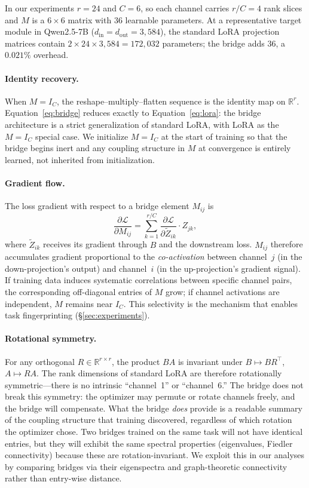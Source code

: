 In our experiments $r = 24$ and $C = 6$, so each channel carries
$r/C = 4$ rank slices and $M$ is a $6 \times 6$ matrix with 36
learnable parameters.
At a representative target module in Qwen2.5-7B
($d_\text{in} = d_\text{out} = 3{,}584$), the standard LoRA
projection matrices contain $2 \times 24 \times 3{,}584 = 172{,}032$
parameters; the bridge adds 36, a $0.021\%$ overhead.

\paragraph{Identity recovery.}
When $M = I_C$, the reshape--multiply--flatten sequence is the identity
map on $\mathbb{R}^r$.
Equation~\eqref{eq:bridge} reduces exactly to
Equation~\eqref{eq:lora}: the bridge architecture is a strict
generalization of standard LoRA, with LoRA as the $M = I_C$ special
case.
We initialize $M = I_C$ at the start of training so that the bridge
begins inert and any coupling structure in $M$ at convergence is
entirely learned, not inherited from initialization.

\paragraph{Gradient flow.}
The loss gradient with respect to a bridge element $M_{ij}$ is
\begin{equation}
  \frac{\partial \mathcal{L}}{\partial M_{ij}}
  = \sum_{k=1}^{r/C}
    \frac{\partial \mathcal{L}}{\partial \tilde{Z}_{ik}}
    \cdot Z_{jk},
  \label{eq:bridge-grad}
\end{equation}
where $\tilde{Z}_{ik}$ receives its gradient through $B$ and the
downstream loss.
$M_{ij}$ therefore accumulates gradient proportional to the
\emph{co-activation} between channel~$j$ (in the down-projection's
output) and channel~$i$ (in the up-projection's gradient signal).
If training data induces systematic correlations between specific
channel pairs, the corresponding off-diagonal entries of $M$ grow;
if channel activations are independent, $M$ remains near $I_C$.
This selectivity is the mechanism that enables task fingerprinting
(\S\ref{sec:experiments}).

\paragraph{Rotational symmetry.}
For any orthogonal $R \in \mathbb{R}^{r \times r}$, the product $BA$
is invariant under $B \mapsto BR^\top$, $A \mapsto RA$.
The rank dimensions of standard LoRA are therefore rotationally
symmetric---there is no intrinsic ``channel~1'' or ``channel~6.''
The bridge does not break this symmetry: the optimizer may permute or
rotate channels freely, and the bridge will compensate.
What the bridge \emph{does} provide is a readable summary of the
coupling structure that training discovered, regardless of which
rotation the optimizer chose.
Two bridges trained on the same task will not have identical entries,
but they will exhibit the same spectral properties (eigenvalues,
Fiedler connectivity) because these are rotation-invariant.
We exploit this in our analyses by comparing bridges via their
eigenspectra and graph-theoretic connectivity rather than entry-wise
distance.

